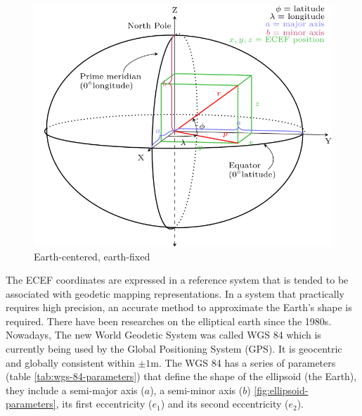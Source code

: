 \begin{figure}[H]
\caption[ECEF]{Earth-centered, earth-fixed \cite{wiki.ecef.2016}}
\label{fig:ecef}
\centering
\includegraphics[width=\textwidth, keepaspectratio]{Figures/ecef.png}
\decoRule
\end{figure}

The ECEF coordinates are expressed in a reference system that is tended to be associated with geodetic mapping representations. In a system that practically requires high precision, an accurate method to approximate the Earth’s shape is required. There have been researches on the elliptical earth since the 1980s. Nowadays, The new World Geodetic System was called WGS 84 which is currently being used by the Global Positioning System (GPS). It is geocentric and globally consistent within $\pm{1}$m. The WGS 84 has a series of parameters (table \ref{tab:wgs-84-parameters}) that define the shape of the ellipsoid (the Earth), they include a semi-major axis ($a$), a semi-minor axis ($b$) \ref{fig:ellipsoid-parameters}, its first eccentricity ($e_1$) and its second eccentricity ($e_2$).

